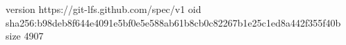version https://git-lfs.github.com/spec/v1
oid sha256:b98deb8f644e4091e5bf0e5e588ab61b8cb0c82267b1e25c1ed8a442f355f40b
size 4907
